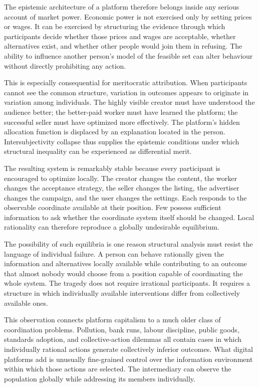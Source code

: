 \documentclass[11pt]{article}
\begin{document}
The epistemic architecture of a platform therefore belongs inside any serious account of market power. Economic power is not exercised only by setting prices or wages. It can be exercised by structuring the evidence through which participants decide whether those prices and wages are acceptable, whether alternatives exist, and whether other people would join them in refusing. The ability to influence another person's model of the feasible set can alter behaviour without directly prohibiting any action.

This is especially consequential for meritocratic attribution. When participants cannot see the common structure, variation in outcomes appears to originate in variation among individuals. The highly visible creator must have understood the audience better; the better-paid worker must have learned the platform; the successful seller must have optimized more effectively. The platform's hidden allocation function is displaced by an explanation located in the person. Intersubjectivity collapse thus supplies the epistemic conditions under which structural inequality can be experienced as differential merit.

The resulting system is remarkably stable because every participant is encouraged to optimize locally. The creator changes the content, the worker changes the acceptance strategy, the seller changes the listing, the advertiser changes the campaign, and the user changes the settings. Each responds to the observable coordinate available at their position. Few possess sufficient information to ask whether the coordinate system itself should be changed. Local rationality can therefore reproduce a globally undesirable equilibrium.

The possibility of such equilibria is one reason structural analysis must resist the language of individual failure. A person can behave rationally given the information and alternatives locally available while contributing to an outcome that almost nobody would choose from a position capable of coordinating the whole system. The tragedy does not require irrational participants. It requires a structure in which individually available interventions differ from collectively available ones.

This observation connects platform capitalism to a much older class of coordination problems. Pollution, bank runs, labour discipline, public goods, standards adoption, and collective-action dilemmas all contain cases in which individually rational actions generate collectively inferior outcomes. What digital platforms add is unusually fine-grained control over the information environment within which those actions are selected. The intermediary can observe the population globally while addressing its members individually.
\end{document}
